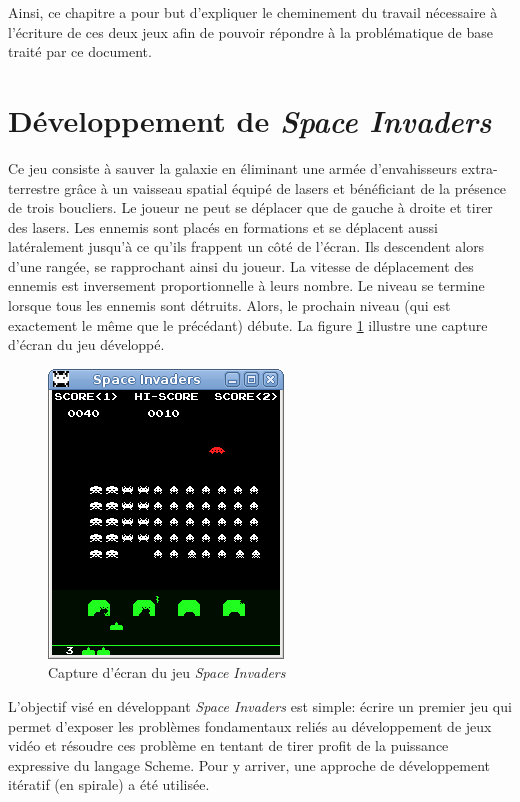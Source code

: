 \documentclass[12pt,oneside,letterpaper,francais]{book}
\newcommand{\si}{{\textit{Space Invaders }}}
\begin{document}
Ainsi, ce chapitre a pour but d'expliquer le cheminement du travail
nécessaire à l'écriture de ces deux jeux afin de pouvoir répondre à la
problématique de base traité par ce document.

\section{Développement de \si}
\label{Exp:SI}

Ce jeu consiste à \og sauver la galaxie \fg en éliminant une armée
d'envahisseurs extra-terrestre grâce à un vaisseau spatial équipé de
lasers et bénéficiant de la présence de trois boucliers. Le joueur ne
peut se déplacer que de gauche à droite et tirer des lasers. Les
ennemis sont placés en formations et se déplacent aussi latéralement
jusqu'à ce qu'ils frappent un côté de l'écran. Ils descendent alors
d'une rangée, se rapprochant ainsi du joueur. La vitesse de
déplacement des ennemis est inversement proportionnelle à leurs
nombre. Le niveau se termine lorsque tous les ennemis sont
détruits. Alors, le prochain niveau (qui est exactement le même que le
précédant) débute. La figure \ref{Exp:si-screen} illustre une capture
d'écran du jeu développé.

\begin{figure}[htb!]
  \center
  \includegraphics[scale=0.7]{space-invaders-screenshot}
  \caption{Capture d'écran du jeu \si}
  \label{Exp:si-screen}
\end{figure}

L'objectif visé en développant \si est simple: écrire un premier jeu
qui permet d'exposer les problèmes fondamentaux reliés au
développement de jeux vidéo et résoudre ces problème en tentant de
tirer profit de la puissance expressive du langage Scheme. Pour y
arriver, une approche de développement itératif (en spirale) a été
utilisée.
\end{document}
